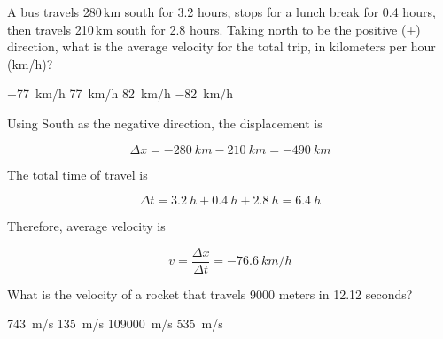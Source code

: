 \documentclass[answers]{exam}
\begin{document}
\begin{questions}

\question
A bus travels 280\,km south for 3.2 hours, stops for a lunch break for 0.4 hours, then travels 210\,km south for 2.8 hours. Taking north to be the positive ($+$) direction, what is the average velocity for the total trip, in kilometers per hour (km/h)?

\begin{randomizechoices}
    \correctchoice \SI{-77}{km/h}
    \choice \SI{77}{km/h}
    \choice \SI{82}{km/h}
    \choice \SI{-82}{km/h}
\end{randomizechoices}


\begin{solution}
    Using South as the negative direction, the displacement is
    
    \begin{equation*}
        \Delta x = -\SI{280}{km} - \SI{210}{km} = \SI{-490}{km}
    \end{equation*}

    The total time of travel is

    \begin{equation*}
        \Delta t = \SI{3.2}{h} + \SI{0.4}{h} + \SI{2.8}{h} = \SI{6.4}{h}
    \end{equation*}

    Therefore, average velocity is

    \begin{equation*}
        v = \frac{\Delta x}{\Delta t} = \boxed{\SI{-76.6}{km/h}}
    \end{equation*}
\end{solution}

\question
What is the velocity of a rocket that travels 9000 meters in 12.12 seconds?

\begin{randomizechoices}
    \correctchoice \SI{743}{m/s}
    \choice \SI{135}{m/s}
    \choice \SI{109000}{m/s}
    \choice \SI{535}{m/s}
\end{randomizechoices}


\end{questions}
\end{document}

